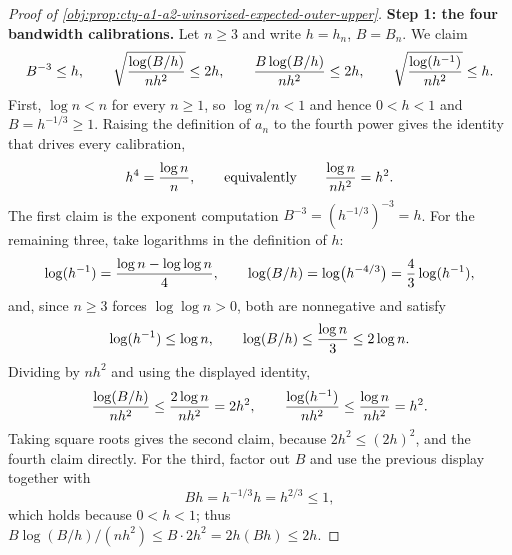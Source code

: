 \begin{proof}[Proof of \cref{obj:prop:cty-a1-a2-winsorized-expected-outer-upper}]
\textbf{Step 1: the four bandwidth calibrations.}  Let \(n\geq3\) and write \(h=h_n\), \(B=B_n\).  We claim
\[
B^{-3}\leq h,
\qquad
\sqrt{\log(B/h)\over nh^2}\leq2h,
\qquad
{B\log(B/h)\over nh^2}\leq2h,
\qquad
\sqrt{\log(h^{-1})\over nh^2}\leq h .
\]
First, \(\log n<n\) for every \(n\geq1\), so \(\log n/n<1\) and hence \(0<h<1\) and \(B=h^{-1/3}\geq1\).  Raising the definition of \(a_n\) to the fourth power gives the identity that drives every calibration,
\[
h^4={\log n\over n},
\qquad\text{equivalently}\qquad
{\log n\over nh^2}=h^2 .
\]
The first claim is the exponent computation \(B^{-3}=(h^{-1/3})^{-3}=h\).
For the remaining three, take logarithms in the definition of \(h\):
\[
\log(h^{-1})={\log n-\log\log n\over4},
\qquad
\log(B/h)=\log\bigl(h^{-4/3}\bigr)={4\over3}\log(h^{-1}),
\]
and, since \(n\geq3\) forces \(\log\log n>0\), both are nonnegative and satisfy
\[
\log(h^{-1})\leq\log n,
\qquad
\log(B/h)\leq{\log n\over3}\leq2\log n .
\]
Dividing by \(nh^2\) and using the displayed identity,
\[
{\log(B/h)\over nh^2}\leq{2\log n\over nh^2}=2h^2,
\qquad
{\log(h^{-1})\over nh^2}\leq{\log n\over nh^2}=h^2 .
\]
Taking square roots gives the second claim, because \(2h^2\leq(2h)^2\), and the fourth claim directly.  For the third, factor out \(B\) and use the previous display together with
\[
Bh=h^{-1/3}h=h^{2/3}\leq1 ,
\]
which holds because \(0<h<1\); thus \(B\log(B/h)/(nh^2)\leq B\cdot2h^2=2h(Bh)\leq2h\).


\end{proof}
